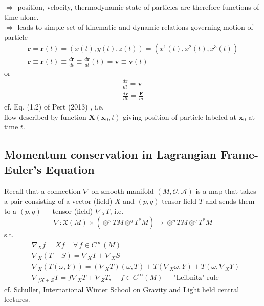 \documentclass[10pt]{amsart}
\begin{document}
\begin{multicols*}{2}
$\Longrightarrow $ position, velocity, thermodynamic state of particles are therefore functions of time alone. \\
$\Longrightarrow$ leads to simple set of kinematic and dynamic relations governing motion of particle \\
\[
\begin{gathered}
	\mathbf{r} = \mathbf{r}(t) = (x(t), y(t), z(t)) = (x^1(t), x^2(t), x^3(t)) \\ 
	\dot{ \mathbf{r}} \equiv \dot{\mathbf{r}}(t) \equiv \frac{d\mathbf{r}}{dt} \equiv \frac{d\mathbf{r}}{dt} (t) = \mathbf{v} \equiv \mathbf{v}(t)
\end{gathered}
\]
or 
\begin{equation}
\begin{gathered}
\frac{d\mathbf{r}}{dt} = \mathbf{v} \\ 
\frac{d\mathbf{v}}{dt} = \frac{\mathbf{F}}{m}
\end{gathered}
\end{equation}
cf. Eq. (1.2) of Pert (2013) \cite{Pert2013}, i.e. \\

flow described by function $\mathbf{X}(\mathbf{x}_0, t)$ giving position of particle labeled at $\mathbf{x}_0$ at time $t$.

\subsection{Momentum conservation in Lagrangian Frame-Euler's Equation}

Recall that a connection $\nabla$ on smooth manifold $(M, \mathcal{O}, \mathcal{A})$ is a map that takes a pair consisting of a vector (field) $X$ and $(p,q)$-tensor field $T$ and sends them to a $(p,q)-$ tensor (field) $\nabla_XT$, i.e. 
\[
\nabla : \mathfrak{X}(M) \times (\otimes^p TM \otimes^q T^*M) \to \otimes^p TM \otimes^q T^*M
\]
s.t. 
\[
\begin{aligned}
& \nabla_X f = Xf \quad \, \forall \, f \in C^{\infty}(M) \\ 
& \nabla_X(T + S) = \nabla_X T + \nabla_X S \\ 
& \nabla_X(T(\omega, Y)) = (\nabla_X T)(\omega, T) + T(\nabla_X \omega, Y) + T(\omega, \nabla_X Y) \\
& \nabla_{fX + Z} T = f\nabla_X T + \nabla_Z T , \quad \, f \in C^{\infty}(M) \quad \, \text{ "Leibnitz" rule }
\end{aligned}
\]
cf. Schuller, International Winter School on Gravity and Light held central lectures.


\end{multicols*}
\end{document}
